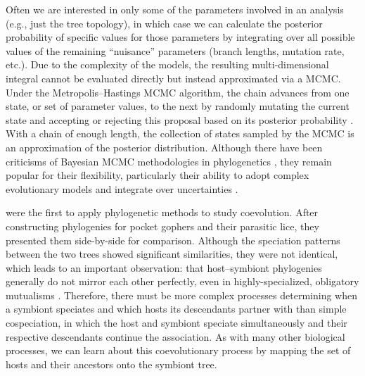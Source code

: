 \documentclass[12pt,letterpaper]{article}
\begin{document}
Often we are interested in only some of the parameters involved in an analysis (e.g., just the tree topology), in which case we can calculate the posterior probability of specific values for those parameters by integrating over all possible values of the remaining \enquote{nuisance} parameters (branch lengths, mutation rate, etc.). Due to the complexity of the models, the resulting multi-dimensional integral cannot be evaluated directly but instead approximated via a \ac{MCMC}. Under the Metropolis--Hastings \ac{MCMC} algorithm, the chain advances from one state, or set of parameter values, to the next by randomly mutating the current state and accepting or rejecting this proposal based on its posterior probability \parencites{Metropolis:1953}{Hastings:1970}. With a chain of enough length, the collection of states sampled by the \ac{MCMC} is an approximation of the posterior distribution. Although there have been criticisms of Bayesian \ac{MCMC} methodologies in phylogenetics \parencites{Felsenstein:2005}{Kolaczkowski:2009}, they remain popular for their flexibility, particularly their ability to adopt complex evolutionary models and integrate over uncertainties \parencites{Huelsenbeck:2001b}{Drummond:2007}{Ronquist:2012}.

\textcite{Haffner:1988} were the first to apply phylogenetic methods to study coevolution. After constructing phylogenies for pocket gophers and their parasitic lice, they presented them side-by-side for comparison. Although the speciation patterns between the two trees showed significant similarities, they were not identical, which leads to an important observation: that host--symbiont phylogenies generally do not mirror each other perfectly, even in highly-specialized, obligatory mutualisms \parencite{Machado:2005}. Therefore, there must be more complex processes determining when a symbiont speciates and which hosts its descendants partner with than simple cospeciation, in which the host and symbiont speciate simultaneously and their respective descendants continue the association. As with many other biological processes, we can learn about this coevolutionary process by mapping the set of hosts and their ancestors onto the symbiont tree.
\end{document}
